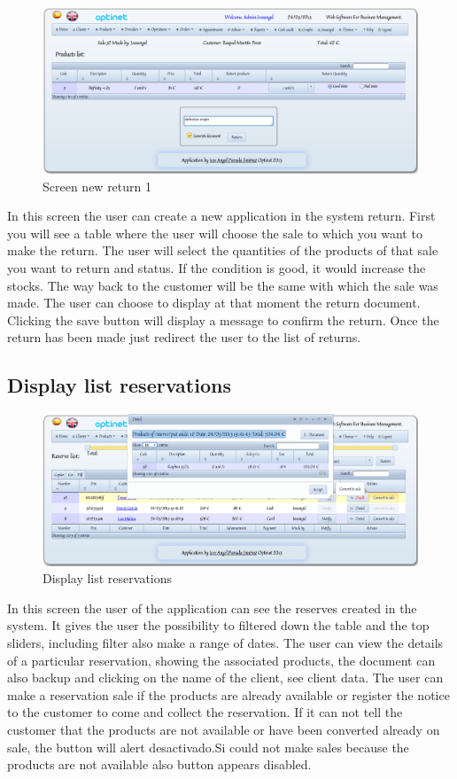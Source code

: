\documentclass[a4paper,11pt]{book}
\begin{document}
\begin{figure}[!htb]
  \centering
    \includegraphics[scale=0.35]{icapnuevadevolucion1.png}
  \caption{Screen new return 1}
  \label{a}
\end{figure}

In this screen the user can create a new application in the system return. First you will see a table where the user will choose the sale to which you want to make the return. The user will select the quantities of the products of that sale you want to return and status. If the condition is good, it would increase the stocks. The way back to the customer will be the same with which the sale was made. The user can choose to display at that moment the return document. Clicking the save button will display a message to confirm the return. Once the return has been made just redirect the user to the list of returns.

\newpage
\subsection {Display list reservations}

\begin{figure}[!htb]
  \centering
    \includegraphics[scale=0.35]{icaplistarreservas.png}
  \caption{Display list reservations}
  \label{a}
\end{figure}

In this screen the user of the application can see the reserves created in the system. It gives the user the possibility to filtered down the table and the top sliders, including filter also make a range of dates. The user can view the details of a particular reservation, showing the associated products, the document can also backup and clicking on the name of the client, see client data. The user can make a reservation sale if the products are already available or register the notice to the customer to come and collect the reservation. If it can not tell the customer that the products are not available or have been converted already on sale, the button will alert desactivado.Si could not make sales because the products are not available also button appears disabled.
\end{document}

